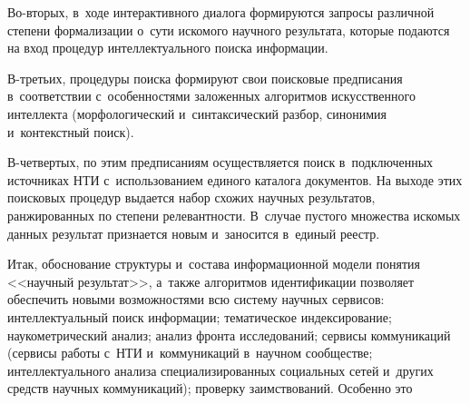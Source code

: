 \begin{multicols}{2}
    Во-вторых, в~ходе интерактивного диалога формируются запросы 
различной степени формализации о~сути искомого научного результата, 
которые подаются на вход процедур интеллектуального поиска информации. 


    В-третьих, процедуры поиска формируют свои поисковые предписания 
в~соответствии с~особенностями заложенных алгоритмов искусственного 
интеллекта (морфологический и~синтаксический разбор, синонимия 
и~контекстный поиск). 
    
    В-четвертых, по этим предписаниям осуществляется поиск 
в~подключенных источниках НТИ с~использованием единого каталога 
документов. На выходе этих поисковых процедур выдается набор схожих 
научных результатов, ранжированных по степени релевантности. В~случае 
пустого множества искомых данных результат признается новым и~заносится в~единый реестр.
    
    Итак, обоснование структуры и~состава информационной модели 
понятия <<научный результат>>, а~также алгоритмов идентификации 
позволяет обеспечить новыми возможностями всю систему научных 
сервисов: интеллектуальный поиск информации; тематическое 
индексирование; наукометрический анализ; анализ фронта исследований; 
сервисы коммуникаций (сервисы работы с~НТИ
 и~коммуникаций в~научном 
сообществе; интеллектуального анализа специализированных социальных 
сетей и~других средств научных коммуникаций); проверку заимствований. 
Особенно это\linebreak\vspace*{-12pt}

\pagebreak

\end{multicols}

\begin{figure*} %
\vspace*{1pt}
    \begin{center}  
  \mbox{%
 \epsfxsize=161.6mm 
 }
\end{center}
\vspace*{-11pt}
\vspace*{-3pt}
\end{figure*}

